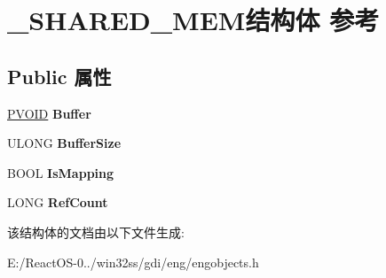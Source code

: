 \hypertarget{struct___s_h_a_r_e_d___m_e_m}{}\section{\+\_\+\+S\+H\+A\+R\+E\+D\+\_\+\+M\+E\+M结构体 参考}
\label{struct___s_h_a_r_e_d___m_e_m}
\subsection*{Public 属性}
\begin{DoxyCompactItemize}
\item 
\mbox{\label{struct___s_h_a_r_e_d___m_e_m_a2c30b3f3f73902d5577a8b6eed1117b0}} 
\hyperlink{interfacevoid}{P\+V\+O\+ID} {\bfseries Buffer}
\item 
\mbox{\label{struct___s_h_a_r_e_d___m_e_m_a1ed5396e68569139123c0c01fd0c50ef}} 
U\+L\+O\+NG {\bfseries Buffer\+Size}
\item 
\mbox{\label{struct___s_h_a_r_e_d___m_e_m_ad068f48a62107069c5b612d3364c1612}} 
B\+O\+OL {\bfseries Is\+Mapping}
\item 
\mbox{\label{struct___s_h_a_r_e_d___m_e_m_a74f84b75a510c5b6f403b89dd97c0189}} 
L\+O\+NG {\bfseries Ref\+Count}
\end{DoxyCompactItemize}


该结构体的文档由以下文件生成\+:\begin{DoxyCompactItemize}
\item 
E\+:/\+React\+O\+S-\/0../win32ss/gdi/eng/engobjects.\+h\end{DoxyCompactItemize}
